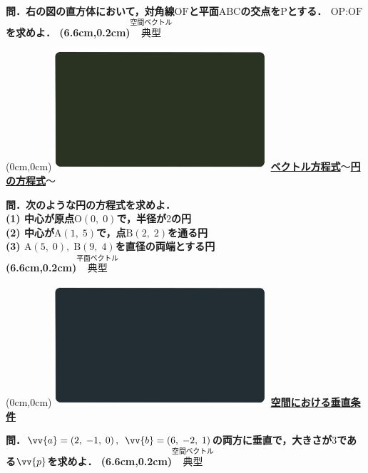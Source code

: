 \documentclass[10pt,
fleqn,
dvipdfmx,
uplatex
]{jsarticle}
\begin{document}
\Large 
\bf\boldmath 問．右の図の直方体において，対角線$\text{OF}$と平面$\text{ABC}$の交点を$\text{P}$とする．
$\text{OP}:\text{OF}$を求めよ．
\at(6.6cm,0.2cm){\small\color{bradorange}$\overset{\text{空間ベクトル}}{\text{典型}}$}


\newpage



\at(0cm,0cm){\includegraphics[width=8cm,bb=0 0 1920 1080]{./youtube/thumbnails/templates/smart_background/平面ベクトル.jpeg}}
{\color{orange}\bf\boldmath\large\underline{ベクトル方程式$〜$円の方程式$〜$}}\vspace{0.3zw}

\normalsize 
\bf\boldmath 問．次のような円の方程式を求めよ．\\
(1)  中心が原点$\text{O}\left(0,\;0\right)$で，半径が$2$の円\\
(2)  中心が$\text{A}\left(1,\;5\right)$で，点$\text{B}\left(2,\;2\right)$を通る円\\
(3)  $\text{A}\left(5,\;0\right),\;\text{B}\left(9,\;4\right)$を直径の両端とする円\\

\at(6.6cm,0.2cm){\small\color{bradorange}$\overset{\text{平面ベクトル}}{\text{典型}}$}


\newpage



\at(0cm,0cm){\includegraphics[width=8cm,bb=0 0 1920 1080]{./youtube/thumbnails/templates/smart_background/空間ベクトル.jpeg}}
{\color{orange}\bf\boldmath\LARGE\underline{空間における垂直条件}}\vspace{0.3zw}

\Large 
\bf\boldmath 問．$\vv{a}=\left(2,\;-1,\;0\right),\;$$\vv{b}=\left(6,\;-2,\;1\right)$の両方に垂直で，大きさが$3$である$\vv{p}$を求めよ．
\at(6.6cm,0.2cm){\small\color{bradorange}$\overset{\text{空間ベクトル}}{\text{典型}}$}
\end{document}
